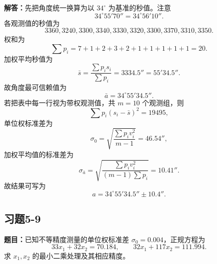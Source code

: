 \documentclass[UTF8,zihao=-4]{ctexart}
\newcommand{\problem}[1]{\subsection*{#1}}
\newcommand{\timu}{\noindent\textbf{题目：}}
\newcommand{\jieda}{\noindent\textbf{解答：}}
\begin{document}
{\jieda 先把角度统一换算为以 $34^\circ$ 为基准的秒值。注意
\begin{equation*}
    34^\circ55'70''=34^\circ56'10''.
\end{equation*}
各观测值的秒值为
\begin{equation*}
    3360,3240,3300,3340,3330,3320,3300,3370,3310,3350.
\end{equation*}
权和为
\begin{equation*}
    \sum p_i=7+1+2+3+2+1+1+1+1+1=20.
\end{equation*}
加权平均秒值为
\begin{equation*}
    \bar{s}=\frac{\sum p_i s_i}{\sum p_i}=3334.5''=55'34.5''.
\end{equation*}
故角度最可信赖值为
\begin{equation*}
    \bar{a}=34^\circ55'34.5''.
\end{equation*}
若把表中每一行视为带权观测值，共 $m=10$ 个观测组，则
\begin{equation*}
    \sum p_i(s_i-\bar{s})^2=19495,
\end{equation*}
单位权标准差为
\begin{equation*}
    \sigma_0=\sqrt{\frac{\sum p_i v_i^2}{m-1}}=46.54'',
\end{equation*}
加权平均值的标准差为
\begin{equation*}
    \sigma_{\bar{a}}=\sqrt{\frac{\sum p_i v_i^2}{(m-1)\sum p_i}}=10.41''.
\end{equation*}
故结果可写为
\begin{equation*}
    a=34^\circ55'34.5''\pm10.4''.
\end{equation*}

\problem{习题5-9}
\timu 已知不等精度测量的单位权标准差 $\sigma_0=0.004$，正规方程为
\begin{equation*}
    33x_1+32x_2=70.184,
    \qquad
    32x_1+117x_2=111.994.
\end{equation*}
求 $x_1,x_2$ 的最小二乘处理及其相应精度。

}
\end{document}
